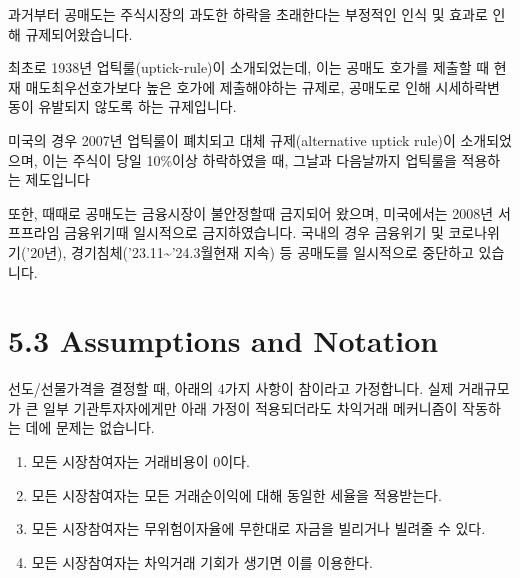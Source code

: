 \documentclass[
  letterpaper,
  DIV=11,
  numbers=noendperiod]{scrreprt}
\providecommand{\tightlist}{%
  \setlength{\itemsep}{0pt}\setlength{\parskip}{0pt}}\usepackage{longtable,booktabs,array}
\begin{document}
\begin{tcolorbox}[enhanced jigsaw, toprule=.15mm, breakable, left=2mm, leftrule=.75mm, opacitybacktitle=0.6, coltitle=black, rightrule=.15mm, colback=white, titlerule=0mm, bottomtitle=1mm, colframe=quarto-callout-note-color-frame, title=\textcolor{quarto-callout-note-color}{\faInfo}\hspace{0.5em}{공매도와 규제}, toptitle=1mm, arc=.35mm, colbacktitle=quarto-callout-note-color!10!white, opacityback=0, bottomrule=.15mm]

과거부터 공매도는 주식시장의 과도한 하락을 초래한다는 부정적인 인식 및
효과로 인해 규제되어왔습니다.

최초로 1938년 업틱룰(uptick-rule)이 소개되었는데, 이는 공매도 호가를
제출할 때 현재 매도최우선호가보다 높은 호가에 제출해야하는 규제로,
공매도로 인해 시세하락변동이 유발되지 않도록 하는 규제입니다.

미국의 경우 2007년 업틱룰이 폐치되고 대체 규제(alternative uptick
rule)이 소개되었으며, 이는 주식이 당일 10\%이상 하락하였을 때, 그날과
다음날까지 업틱룰을 적용하는 제도입니다

또한, 때때로 공매도는 금융시장이 불안정할때 금지되어 왔으며, 미국에서는
2008년 서프프라임 금융위기때 일시적으로 금지하였습니다. 국내의 경우
금융위기 및 코로나위기('20년), 경기침체('23.11\textasciitilde'24.3월현재
지속) 등 공매도를 일시적으로 중단하고 있습니다.

\end{tcolorbox}

\section*{5.3 Assumptions and Notation}\label{assumptions-and-notation}


선도/선물가격을 결정할 때, 아래의 4가지 사항이 참이라고 가정합니다. 실제
거래규모가 큰 일부 기관투자자에게만 아래 가정이 적용되더라도 차익거래
메커니즘이 작동하는 데에 문제는 없습니다.

\begin{enumerate}
\def\labelenumi{\arabic{enumi}.}
\tightlist
\item
  모든 시장참여자는 거래비용이 0이다.
\item
  모든 시장참여자는 모든 거래순이익에 대해 동일한 세율을 적용받는다.
\item
  모든 시장참여자는 무위험이자율에 무한대로 자금을 빌리거나 빌려줄 수
  있다.
\item
  모든 시장참여자는 차익거래 기회가 생기면 이를 이용한다.
\end{enumerate}
\end{document}
